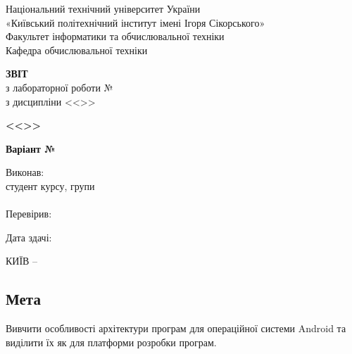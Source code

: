 \documentclass[14pt, a4paper]{extreport}
\begin{document}
	
	\begin{titlepage}
		\begin{center}
			\normalsize
			Національний технічний університет України\\
			«Київський політехнічний інститут імені Ігоря Сікорського» \\[0.5em]
			Факультет інформатики та обчислювальної техніки\\
			Кафедра обчислювальної техніки
			
			\vfill
			
			{\large \textbf{ЗВІТ}\\[0.5em]}
			{з лабораторної роботи №\LabNumber \\}
			{з дисципліни <<\CourseTitle>>}
			
			\vspace{2em}
			
			{\textbf{<<\Topic>>}}
			
			\vspace{1em}
			
			{\textbf{Варіант №\Variant}}
			
			\vfill
			
			\begin{flushright}
				Виконав: \\ студент \CourseNumber{} курсу, групи \StudentGroup \\
				\StudentName \\[1em]
				Перевірив: \\ \Teacher
			\end{flushright}
			
			\vfill
			
			\begin{flushright}
				Дата здачі: \DTMtoday
			\end{flushright}
			
			\vspace{5em}
			КИЇВ -- \ReportYear
		\end{center}
	\end{titlepage}
	
	\clearpage
	\setcounter{page}{2}
	
	\subsection*{Мета} 
	
	Вивчити особливості архітектури програм для операційної системи Android та виділити їх як для платформи розробки програм.
	
\end{document}
